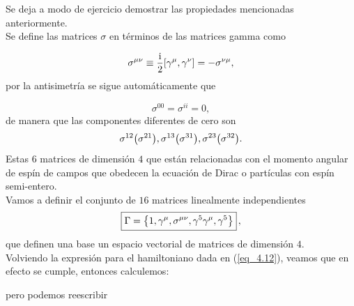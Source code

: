 Se deja a modo de ejercicio demostrar las propiedades mencionadas anteriormente.\\

Se define las matrices $\sigma$ en términos de las matrices gamma como

\begin{equation}
	\sigma^{\mu \nu} \equiv \frac{\ii}{2} \comm{\gamma^\mu}{\gamma^\nu} = - \sigma^{\nu \mu}, 
\end{equation}
por la antisimetría se sigue automáticamente que  

\begin{equation}
	\sigma^{00} = \sigma^{ii} = 0,
\end{equation}
de manera que las componentes diferentes de cero son
\begin{equation}
	\sigma^{12} \qty(\sigma^{21}) , \sigma^{13} \qty(\sigma^{31}) , \sigma^{23} \qty(\sigma^{32}) . 
\end{equation}
Estas 6 matrices de dimensión $4$ que están relacionadas con el momento angular de espín de campos que obedecen la ecuación de Dirac o partículas con espín semi-entero.\\

Vamos a definir el conjunto de $16$ matrices linealmente independientes 
\begin{equation}
	\boxed{
	\Gamma = \qty{ 1, \gamma^\mu, \sigma^{\mu \nu}, \gamma^5 \gamma^\mu, \gamma^5 } } \, ,
\end{equation}
que definen una base un espacio vectorial de matrices de dimensión $4$.\\


 Volviendo la expresión para el hamiltoniano dada en (\ref{eq_4.12}), veamos que en efecto se cumple, entonces calculemos:
 
pero podemos reescribir 

